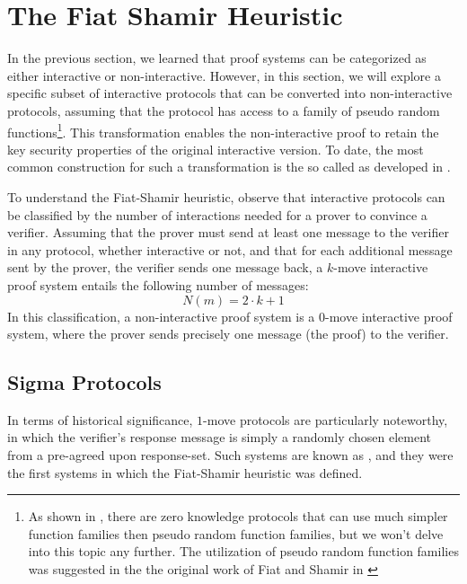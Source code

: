 \section{The Fiat Shamir Heuristic}\label{sec:Fiat-Shamir}
In the previous section, we learned that proof systems can be categorized as either interactive or non-interactive. However, in this section, we will explore a specific subset of interactive protocols that can be converted into non-interactive protocols, assuming that the protocol has access to a family of pseudo random functions\footnote{As shown in \cite{chen-20}, there are zero knowledge protocols that can use much simpler function families then pseudo random function families, but we won't delve into this topic any further. The utilization of pseudo random function families was suggested in the the original work of Fiat and Shamir in \cite{fiat-86}}. This transformation enables the non-interactive proof to retain the key security properties of the original interactive version. To date, the most common construction for such a transformation is the so called  as developed in \cite{fiat-86}. 

To understand the Fiat-Shamir heuristic, observe that interactive protocols can be classified by the number of interactions needed for a prover to convince a verifier. Assuming that the prover must send at least one message to the verifier in any protocol, whether interactive or not, and that for each additional message sent by the prover, the verifier sends one message back, a $k$-move interactive proof system entails the following number of messages:
\begin{equation}
\label{def:k-move-interactive-protocol}
N(m) = 2\cdot k +1
\end{equation}
In this classification, a non-interactive proof system is a $0$-move interactive proof system, where the prover sends precisely one message (the proof) to the verifier. 

\subsection{Sigma Protocols}
In terms of historical significance, $1$-move protocols are particularly noteworthy, in which the verifier's response message is simply a randomly chosen element from a pre-agreed upon response-set. Such systems are known as , and they were the first systems in which the Fiat-Shamir heuristic was defined.

